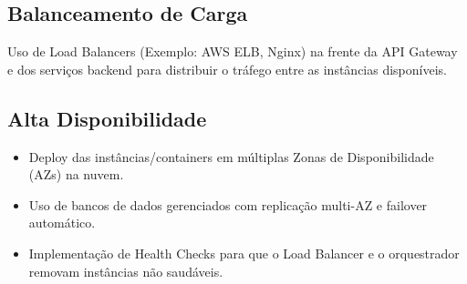\subsection{Balanceamento de Carga}
\label{subsec:balanceamento-carga}
Uso de Load Balancers (Exemplo: AWS ELB, Nginx) na frente da API Gateway e dos serviços backend para distribuir o tráfego entre as instâncias disponíveis.

\subsection{Alta Disponibilidade}
\label{subsec:alta-disponibilidade}
\begin{itemize}
    \item Deploy das instâncias/containers em múltiplas Zonas de Disponibilidade (AZs) na nuvem.
    \item Uso de bancos de dados gerenciados com replicação multi-AZ e failover automático.
    \item Implementação de Health Checks para que o Load Balancer e o orquestrador removam instâncias não saudáveis.
\end{itemize}

